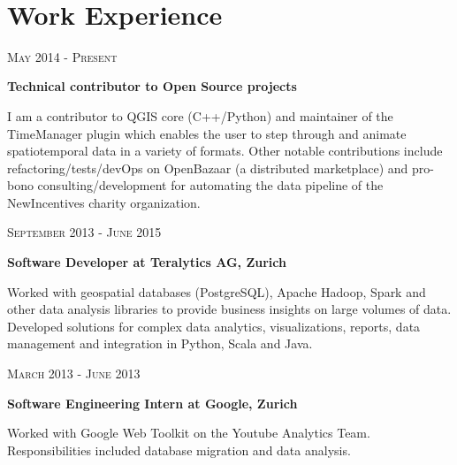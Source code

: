 \documentclass[10pt]{article} %
\begin{document}
\begin{minipage}[t]{0.5\textwidth}
\begin{tabular}{rl}
\end{tabular}\\[9pt]


\section{Work Experience} 

{\raggedleft\textsc{May 2014 - Present}\par}

{\raggedright\large \textbf{Technical contributor to Open Source projects}\\
}

\normalsize{ I am a contributor to QGIS core (C++/Python) and maintainer of the TimeManager plugin which enables the user to step through and animate spatiotemporal data in a variety of formats. Other notable contributions include refactoring/tests/devOps on OpenBazaar (a distributed marketplace) and pro-bono consulting/development for automating the data pipeline of the NewIncentives charity organization.}

{\raggedleft\textsc{September 2013 - June 2015}\par}

{\raggedright\large \textbf{Software Developer at Teralytics AG, Zurich}\\
}

\normalsize{Worked with geospatial databases (PostgreSQL), Apache Hadoop, Spark and other data analysis libraries to provide business insights on large volumes of data. Developed solutions for complex data analytics, visualizations, reports, data management and integration in Python, Scala and Java.}

{\raggedleft\textsc{March 2013 - June 2013}\par}

{\raggedright\large \textbf{Software Engineering Intern at Google, Zurich}\\
}

\normalsize{Worked with Google Web Toolkit on the Youtube Analytics Team. Responsibilities included database migration and data analysis.}\\


\end{minipage}
\end{document}
